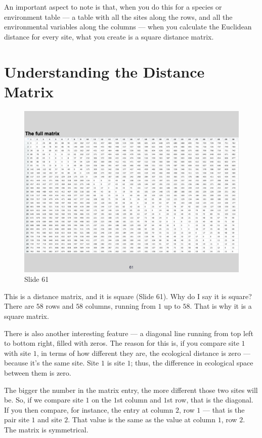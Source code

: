 \documentclass[
  10pt,
]{book}
\begin{document}
An important aspect to note is that, when you do this for a species or
environment table --- a table with all the sites along the rows, and all
the environmental variables along the columns --- when you calculate the
Euclidean distance for every site, what you create is a square distance
matrix.

\section{Understanding the Distance
Matrix}\label{understanding-the-distance-matrix}

\begin{figure}[ht]
\centering
\includegraphics[width=0.8\linewidth]{../images/BDC334/BDC334-061.jpeg}
\caption*{Slide 61}
\end{figure}

This is a distance matrix, and it is square (Slide 61). Why do I say it
is square? There are \(58\) rows and \(58\) columns, running from \(1\)
up to \(58\). That is why it is a square matrix.

There is also another interesting feature --- a diagonal line running
from top left to bottom right, filled with zeros. The reason for this
is, if you compare site \(1\) with site \(1\), in terms of how different
they are, the ecological distance is zero --- because it's the same
site. Site \(1\) is site \(1\); thus, the difference in ecological space
between them is zero.

The bigger the number in the matrix entry, the more different those two
sites will be. So, if we compare site \(1\) on the \(1\)st column and
\(1\)st row, that is the diagonal. If you then compare, for instance,
the entry at column \(2\), row \(1\) --- that is the pair site \(1\) and
site \(2\). That value is the same as the value at column \(1\), row
\(2\). The matrix is symmetrical.
\end{document}
